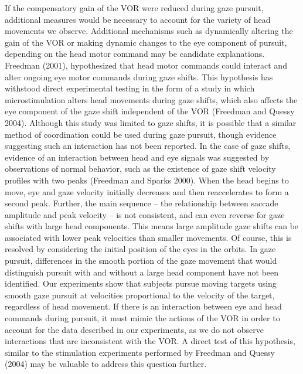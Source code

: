 \documentclass[12pt]{article}
\begin{document}
If the compensatory gain of the VOR were reduced during gaze pursuit, additional measures would be necessary to account for the variety of head movements we observe. Additional mechanisms such as dynamically altering the gain of the VOR or making dynamic changes to the eye component of pursuit, depending on the head motor command may be candidate explanations. Freedman (2001), hypothesized that head motor commands could interact and alter ongoing eye motor commands during gaze shifts. This hypothesis has withstood direct experimental testing in the form of a study in which microstimulation alters head movements during gaze shifts, which also affects the eye component of the gaze shift independent of the VOR (Freedman and Quessy 2004). Although this study was limited to gaze shifts, it is possible that a similar method of coordination could be used during gaze pursuit, though evidence suggesting such an interaction has not been reported. In the case of gaze shifts, evidence of an interaction between head and eye signals was suggested by observations of normal behavior, such as the existence of gaze shift velocity profiles with two peaks (Freedman and Sparks 2000).  When the head begins to move, eye and gaze velocity initially decreases and then reaccelerates to form a second peak. Further, the main sequence – the relationship between saccade amplitude and peak velocity – is not consistent, and can even reverse for gaze shifts with large head components. This means large amplitude gaze shifts can be associated with lower peak velocities than smaller movements. Of course, this is resolved by considering the initial position of the eyes in the orbits. In gaze pursuit, differences in the smooth portion of the gaze movement that would distinguish pursuit with and without a large head component have not been identified. Our experiments show that subjects pursue moving targets using smooth gaze pursuit at velocities proportional to the velocity of the target, regardless of head movement. If there is an interaction between eye and head commands during pursuit, it must mimic the actions of the VOR in order to account for the data described in our experiments, as we do not observe interactions that are inconsistent with the VOR. A direct test of this hypothesis, similar to the stimulation experiments performed by Freedman and Quessy (2004) may be valuable to address this question further.
\end{document}
